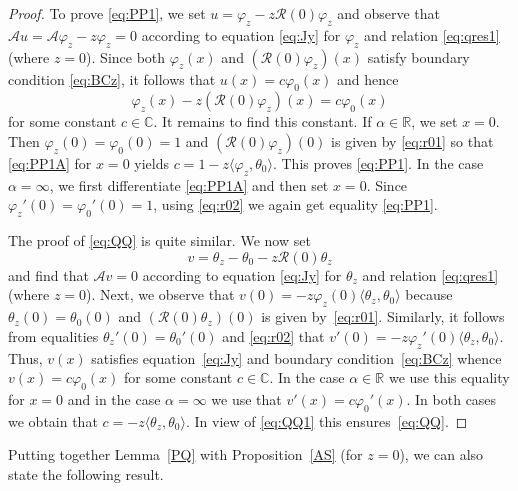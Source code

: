 \documentclass[pdftex]{sigma}%
\numberwithin{equation}{section}
\begin{document}
\begin{proof}
 To prove \eqref{eq:PP1}, we set
 $ u= \varphi_{z} -z {\mathcal R}(0) \varphi_{z} $
and observe that $ {\mathcal A } u= {\mathcal A }\varphi_{z}-z \varphi_{z} =0$ according to equation \eqref{eq:Jy} for $ \varphi_{z} $ and relation \eqref{eq:qres1} (where $z=0$). Since both $ \varphi_{z} (x) $ and $( {\mathcal R}(0) \varphi_{z} ) (x) $ satisfy boundary condition \eqref{eq:BCz}, it follows that $u(x)=c \varphi_{0} (x)$ and hence
 \begin{equation}
\varphi_{z}(x) - z ({\mathcal R}(0) \varphi_{z} )(x)= c \varphi_{0} (x)
\label{eq:PP1A}\end{equation}
for some constant $c\in{\mathbb C}$.
It remains to find this constant. If $\alpha\in {\mathbb R}$, we set $x=0$. Then $\varphi_{z} (0)=\varphi_0 (0)=1$ and
$({\mathcal R}(0) \varphi_{z} )(0)$ is given by \eqref{eq:r01} so that \eqref{eq:PP1A} for $x=0$ yields $c= 1-z \langle \varphi_{z}, \theta_{0}\rangle$. This proves \eqref{eq:PP1}. In the case
 $\alpha=\infty$, we first differentiate \eqref{eq:PP1A} and then set $x=0$. Since $\varphi_{z}' (0)=\varphi_0' (0)=1$,
using \eqref{eq:r02} we again get equality \eqref{eq:PP1}.

The proof of \eqref{eq:QQ} is quite similar. We now set
 \begin{equation}
 v=\theta_{z} - \theta_{0} -z {\mathcal R}(0) \theta_{z}
\label{eq:QQ1}\end{equation}
and find that $ {\mathcal A } v= 0$ according to equation \eqref{eq:Jy} for $\theta_{z} $ and relation \eqref{eq:qres1} (where $z=0$). Next, we observe that
 $v (0)= -z \varphi_{z}(0)\langle \theta_{z}, \theta_{0}\rangle$ because $\theta_{z} (0)= \theta_{0} (0)$ and $ ({\mathcal R}(0) \theta_{z})(0)$ is given by~\eqref{eq:r01}. Similarly, it follows from equalities $\theta_{z}' (0)= \theta_{0}' (0)$ and \eqref{eq:r02} that $v' (0)= -z \varphi_{z}'(0)\langle \theta_{z}, \theta_{0}\rangle$. Thus, $v(x)$ satisfies equation~\eqref{eq:Jy}
 and boundary condition~\eqref{eq:BCz} whence $v(x)=c \varphi_{0} (x)$ for some constant $c\in{\mathbb C}$.
 In the case
 $\alpha\in {\mathbb R}$ we use this equality for $x=0$ and in the case
 $\alpha=\infty$ we use that $v'(x)=c \varphi_{0}' (x)$. In both cases we obtain that $c=- z \langle \theta_{z}, \theta_{0} \rangle$. In view of \eqref{eq:QQ1} this ensures~\eqref{eq:QQ}.
\end{proof}

 Putting together Lemma~\ref{PQ} with Proposition~\ref{AS} (for $z=0$), we can also state the following result.
\end{document}
